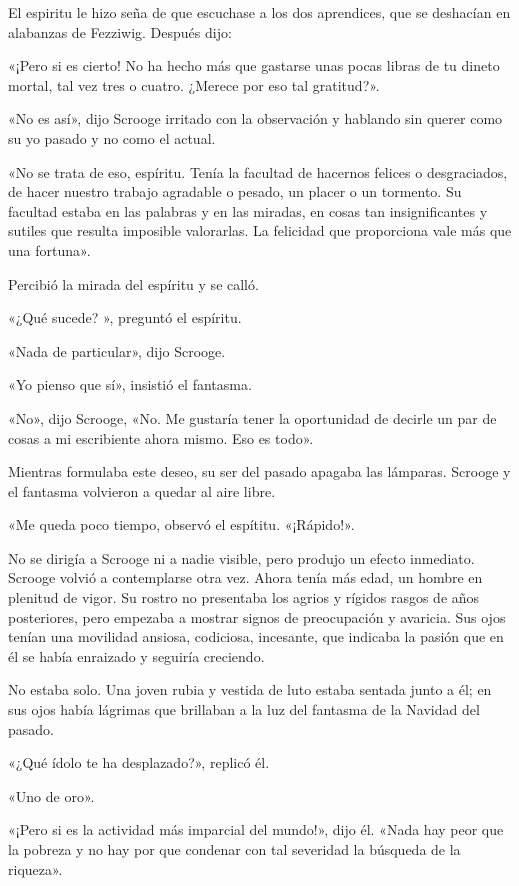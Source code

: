 \documentclass{novela}
\begin{document}
 El espiritu le hizo seña de que escuchase a los dos aprendices, que se deshacían en alabanzas de Fezziwig. Después dijo:

 «¡Pero si es cierto! No ha hecho más que gastarse unas pocas libras de tu dineto mortal, tal vez tres o cuatro. ¿Merece por eso tal gratitud?».

 «No es así», dijo Scrooge irritado con la observación y hablando sin querer como su yo pasado y no como el actual.

 «No se trata de eso, espíritu. Tenía la facultad de hacernos felices o desgraciados, de hacer nuestro trabajo agradable o pesado, un placer o un tormento. Su facultad estaba en las palabras y en las miradas, en cosas tan insignificantes y sutiles que resulta imposible valorarlas. La felicidad que proporciona vale más que una fortuna».

 Percibió la mirada del espíritu y se calló.

 «¿Qué sucede? », preguntó el espíritu.

 «Nada de particular», dijo Scrooge.

 «Yo pienso que sí», insistió el fantasma.

 «No», dijo Scrooge, «No. Me gustaría tener la oportunidad de decirle un par de cosas a mi escribiente ahora mismo. Eso es todo».

 Mientras formulaba este deseo, su ser del pasado apagaba las lámparas. Scrooge y el fantasma volvieron a quedar al aire libre.

 «Me queda poco tiempo, observó el espítitu. «¡Rápido!».

 No se dirigía a Scrooge ni a nadie visible, pero produjo un efecto inmediato. Scrooge volvió a contemplarse otra vez. Ahora tenía más edad, un hombre en plenitud de vigor. Su rostro no presentaba los agrios y rígidos rasgos de años posteriores, pero empezaba a mostrar signos de preocupación y avaricia. Sus ojos tenían una movilidad ansiosa, codiciosa, incesante, que indicaba la pasión que en él se había enraizado y seguiría creciendo.

 No estaba solo. Una joven rubia y vestida de luto estaba sentada junto a él; en sus ojos había lágrimas que brillaban a la luz del fantasma de la Navidad del pasado.

 «¿Qué ídolo te ha desplazado?», replicó él.

 «Uno de oro».

 «¡Pero si es la actividad más imparcial del mundo!», dijo él. «Nada hay peor que la pobreza y no hay por que condenar con tal severidad la búsqueda de la riqueza».
\end{document}
